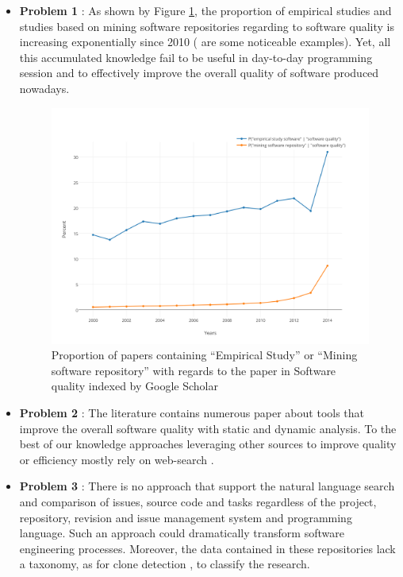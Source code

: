 \begin{itemize}
	\item {\bf Problem 1} : As shown by Figure \ref{fig:scholar}, the proportion of empirical studies and studies based on mining software repositories regarding to software quality is increasing exponentially since 2010 (\cite{Kim2011a,Lee2011a,Sun2011,Bhattacharya2011,Tian2012a,Zimmermann2012, Shang2013,Chen2014,Mcintosh,Hemmati2015} are some noticeable examples). 
	Yet, all this accumulated knowledge fail to be useful in day-to-day programming session and to effectively improve the overall quality of software produced nowadays.

	\begin{figure}[h!]
	  \centering
	  	    \includegraphics[scale=0.7]{media/scholar.png}
	    \caption{Proportion of papers containing ``Empirical Study'' or ``Mining software repository'' with regards to the paper in Software quality indexed by Google Scholar	\label{fig:scholar}}
	\end{figure}

	\item {\bf Problem 2} : The literature contains numerous paper about tools that improve the overall software quality with static \cite{Dangel2000, burn2003checkstyle,Hovemeyer2007,Moha2010} and dynamic \cite{Nayrolles,Nayrolles2013a,Palma2013} analysis. To the best of our knowledge approaches leveraging other sources to improve quality or efficiency mostly rely on web-search \cite{Brandt2009,Rahman2013,Montandon2013}.

	\item {\bf Problem 3} : There is no approach that support the natural language search and comparison of issues, source code and tasks regardless of the project, repository, revision and issue management system and programming language. Such an approach could dramatically transform software engineering processes. Moreover, the data contained in these repositories lack a taxonomy, as for clone detection \cite{CoryKapser}, to classify the research.
\end{itemize}

